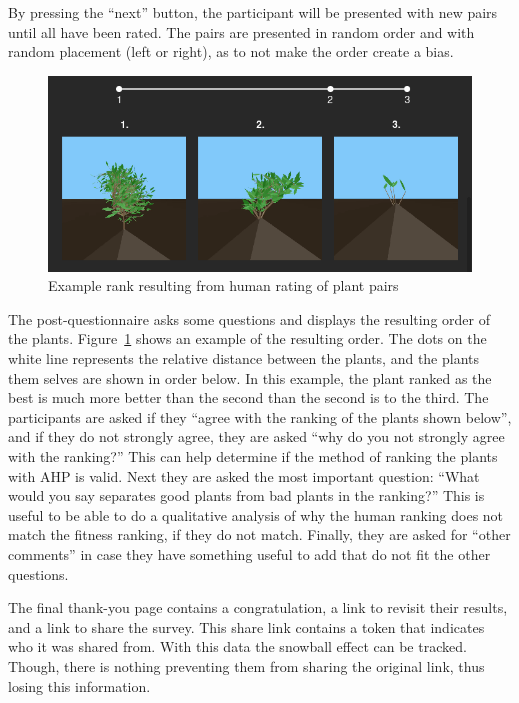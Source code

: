 By pressing the ``next'' button, the participant will be presented with new pairs until all have been rated.
The pairs are presented in random order and with random placement (left or right), as to not make the order create a bias.

\begin{figure}
    \centering
    \includegraphics[width=1.0\textwidth]{figures/rank}
    \caption{Example rank resulting from human rating of plant pairs}
    \label{fig:rank}
\end{figure}

The post-questionnaire asks some questions and displays the resulting order of the plants.
Figure~\ref{fig:rank} shows an example of the resulting order.
The dots on the white line represents the relative distance between the plants, and the plants them selves are shown in order below.
In this example, the plant ranked as the best is much more better than the second than the second is to the third.
The participants are asked if they ``agree with the ranking of the plants shown below'', and if they do not strongly agree, they are asked ``why do you not strongly agree with the ranking?''
This can help determine if the method of ranking the plants with AHP is valid.
Next they are asked the most important question: ``What would you say separates good plants from bad plants in the ranking?''
This is useful to be able to do a qualitative analysis of why the human ranking does not match the fitness ranking, if they do not match.
Finally, they are asked for ``other comments'' in case they have something useful to add that do not fit the other questions.

The final thank-you page contains a congratulation, a link to revisit their results, and a link to share the survey.
This share link contains a token that indicates who it was shared from.
With this data the snowball effect can be tracked.
Though, there is nothing preventing them from sharing the original link, thus losing this information.

